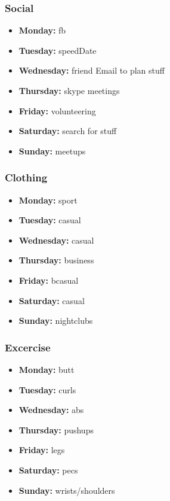 \begin{frame} 
\frametitle{Social} 
\begin{itemize} 
\item \textbf{Monday:}   fb   
\item \textbf{Tuesday:}   speedDate
\item \textbf{Wednesday:} friend Email to plan stuff 
\item \textbf{Thursday:}  skype meetings
\item \textbf{Friday:}    volunteering
\item \textbf{Saturday:}  search for stuff
\item \textbf{Sunday:}    meetups
\end{itemize} 
\end{frame} 

\begin{frame} 
\frametitle{Clothing} 
\begin{itemize} 
\item \textbf{Monday:}   sport    
\item \textbf{Tuesday:}   casual
\item \textbf{Wednesday:} casual 
\item \textbf{Thursday:}  business
\item \textbf{Friday:}    bcasual
\item \textbf{Saturday:}  casual
\item \textbf{Sunday:}    nightclubs
\end{itemize} 
\end{frame} 


\begin{frame} 
\frametitle{Excercise} 
\begin{itemize} 
\item \textbf{Monday:}    butt
\item \textbf{Tuesday:}   curls
\item \textbf{Wednesday:} abs
\item \textbf{Thursday:}  pushups
\item \textbf{Friday:}    legs
\item \textbf{Saturday:}  pecs
\item \textbf{Sunday:}    wrists/shoulders
\end{itemize} 
\end{frame} 



